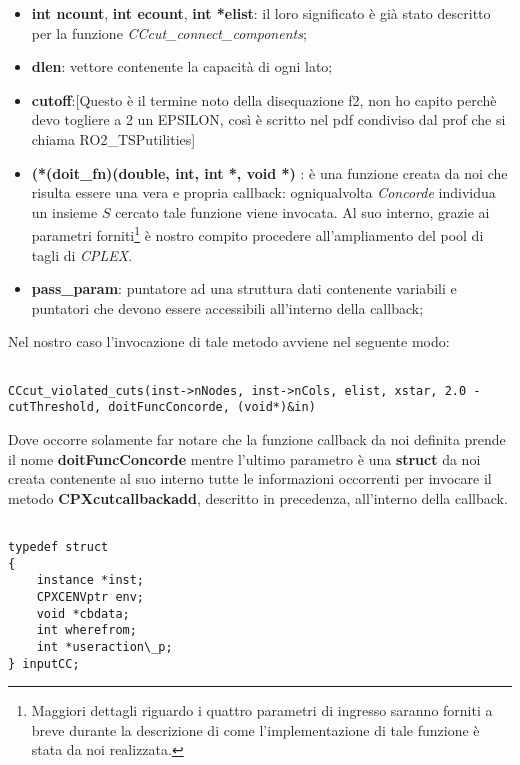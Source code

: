 \documentclass[11pt]{article}
\begin{document}
\begin{itemize}
    \item \textbf{int ncount}, \textbf{int ecount}, \textbf{int *elist}: il loro significato è già stato descritto per la funzione \textit{CCcut\_connect\_components};
    \item \textbf{dlen}: vettore contenente la capacità di ogni lato;
    \item \textbf{cutoff}:[Questo è il termine noto della disequazione f2, non ho capito perchè devo togliere a 2 un EPSILON, così è scritto nel pdf condiviso dal prof che si chiama         RO2\_TSPutilities]
    \item \textbf{(*(doit\_fn)(double, int, int *, void *) }: è una funzione creata da noi che risulta essere una vera e propria callback: ogniqualvolta \textit{Concorde} individua un insieme $S$ cercato tale funzione viene invocata. Al suo interno, grazie ai parametri forniti\footnote{Maggiori dettagli riguardo i quattro parametri di ingresso saranno forniti a breve durante la descrizione di come l'implementazione di tale funzione è stata da noi realizzata.} è nostro compito procedere all'ampliamento del pool di tagli di \textit{CPLEX}.
    \item \textbf{pass\_param}: puntatore ad una struttura dati contenente variabili e puntatori che devono essere accessibili all’interno della callback;
\end{itemize}

Nel nostro caso l'invocazione di tale metodo avviene nel seguente modo:

\begin{lstlisting}

CCcut_violated_cuts(inst->nNodes, inst->nCols, elist, xstar, 2.0 - cutThreshold, doitFuncConcorde, (void*)&in)

\end{lstlisting}

Dove occorre solamente far notare che la funzione callback da noi definita prende il nome \textbf{doitFuncConcorde} mentre l'ultimo parametro è una \textbf{struct} da noi creata contenente al suo interno tutte le informazioni occorrenti per invocare il metodo \textbf{CPXcutcallbackadd}, descritto in precedenza, all'interno della callback.

\begin{lstlisting}

typedef struct 
{
    instance *inst;
    CPXCENVptr env;
    void *cbdata;
    int wherefrom;
    int *useraction\_p;
} inputCC;

\end{lstlisting}
\end{document}

